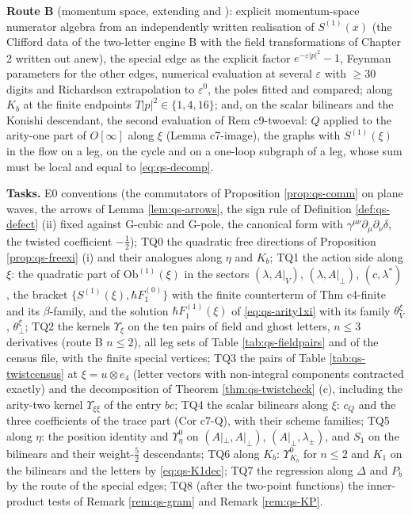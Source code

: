 \documentclass[11pt]{article}
\numberwithin{equation}{section}
\theoremstyle{plain}
\theoremstyle{definition}
\newcommand{\Ap}{A|_{\perp}}
\newcommand{\AV}{A|_V}
\begin{document}
\textbf{Route B} (momentum space, extending  and ): explicit momentum-space numerator algebra from an independently written realisation of $S^{(1)}(x)$ (the Clifford data of the two-letter engine B with the field transformations of Chapter 2 written out anew), the special edge as the explicit factor $e^{-\varepsilon|p|^2}-1$, Feynman parameters for the other edges, numerical evaluation at several $\varepsilon$ with $\ge30$ digits and Richardson extrapolation to $\varepsilon^0$, the poles fitted and compared; along $K_b$ at the finite endpoints $T|p|^2\in\{1,4,16\}$; and, on the scalar bilinears and the Konishi descendant, the second evaluation of Rem c9-twoeval: $Q$ applied to the arity-one part of $O[\infty]$ along $\xi$ (Lemma c7-image), the graphs with $S^{(1)}(\xi)$ in the flow on a leg, on the cycle and on a one-loop subgraph of a leg, whose sum must be local and equal to \eqref{eq:qs-decomp}.

\textbf{Tasks.} E0 conventions (the commutators of Proposition \ref{prop:qs-comm} on plane waves, the arrows of Lemma \ref{lem:qs-arrows}, the sign rule of Definition \ref{def:qs-defect} (ii) fixed against G-cubic and G-pole, the canonical form with $\gamma^{\mu\nu}\partial_\mu\partial_\nu\delta$, the twisted coefficient $-\tfrac12$); TQ0 the quadratic free directions of Proposition \ref{prop:qs-freexi} (i) and their analogues along $\eta$ and $K_b$; TQ1 the action side along $\xi$: the quadratic part of $\mathrm{Ob}^{(1)}(\xi)$ in the sectors $(\lambda,\AV)$, $(\lambda,\Ap)$, $(c,\lambda^*)$, the bracket $\{S^{(1)}(\xi),\hbar F_1^{(0)}\}$ with the finite counterterm of Thm c4-finite and its $\beta$-family, and the solution $\hbar F_1^{(1)}(\xi)$ of \eqref{eq:qs-arity1xi} with its family $\theta^\xi_V$, $\theta^\xi_\perp$; TQ2 the kernels $\Upsilon_\xi$ on the ten pairs of field and ghost letters, $n\le3$ derivatives (route B $n\le2$), all leg sets of Table \ref{tab:qs-fieldpairs} and of the census file, with the finite special vertices; TQ3 the pairs of Table \ref{tab:qs-twistcensus} at $\xi=u\otimes e_4$ (letter vectors with non-integral components contracted exactly) and the decomposition of Theorem \ref{thm:qs-twistcheck} (c), including the arity-two kernel $\Upsilon_{\xi\xi}$ of the entry $bc$; TQ4 the scalar bilinears along $\xi$: $c_Q$ and the three coefficients of the trace part (Cor c7-Q), with their scheme families; TQ5 along $\eta$: the position identity and $\Upsilon^0_\eta$ on $(\Ap,\Ap)$, $(\Ap,\lambda_\pm)$, and $S_1$ on the bilinears and their weight-$\tfrac52$ descendants; TQ6 along $K_b$: $\Upsilon^0_{K_b}$ for $n\le2$ and $K_1$ on the bilinears and the letters by \eqref{eq:qs-K1dec}; TQ7 the regression along $\Delta$ and $P_b$ by the route of the special edges; TQ8 (after the two-point functions) the inner-product tests of Remark \ref{rem:qs-gram} and Remark \ref{rem:qs-KP}.
\end{document}
